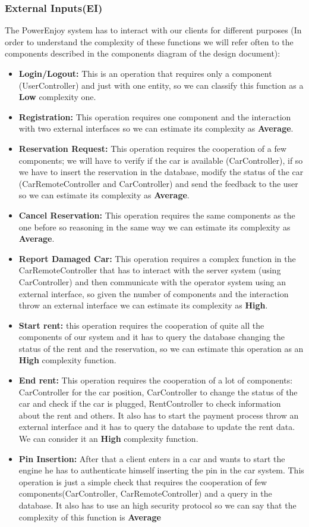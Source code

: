 \subsubsection{External Inputs(EI)}
The PowerEnjoy system has to interact with our clients for different purposes (In order to understand the complexity of these functions we will refer often to the components described in the components diagram of the design document):
\begin{itemize}
\item \textbf{Login/Logout:} This is an operation that requires only a component (UserController) and just with one entity, so we can classify this function as a \textbf{Low} complexity one.
\item \textbf{Registration:} This operation requires one component and the interaction with two external interfaces so we can estimate its complexity as \textbf{Average}.
\item \textbf{Reservation Request:} This operation requires the cooperation of a few components; we will have to verify if the car is available (CarController), if so we have to insert the reservation in the database, modify the status of the car (CarRemoteController and CarController) and send the feedback to the user so we can estimate its complexity as \textbf{Average}.
\item \textbf{Cancel Reservation:} This operation requires the same components as the one before so reasoning in the same way we can estimate its complexity as \textbf{Average}.
\item \textbf{Report Damaged Car:} This operation requires a complex function in the CarRemoteController that has to interact with the server system (using CarController) and then communicate with the operator system using an external interface, so given the number of components and the interaction throw an external interface we can estimate its complexity as \textbf{High}.
\item \textbf{Start rent:} this operation requires the cooperation of quite all the components of our system and it has to query the database changing the status of the rent and the reservation, so we can estimate this operation as an \textbf{High} complexity function.
\item \textbf{End rent:} This operation requires the cooperation of a lot of components: CarController for the car position, CarController to change the status of the car and check if the car is plugged, RentController to check information about the rent and others. It also has to start the payment process throw an external interface and it has to query the database to update the rent data. We can consider it an \textbf{High} complexity function.
\item \textbf{Pin Insertion:} After that a client enters in a car and wants to start the engine he has to authenticate  himself inserting the pin in the car system. This operation is just a simple check that  requires the cooperation of few components(CarController, CarRemoteController) and a query in the database. It also has to use an high security protocol so we can say that the complexity of this function is \textbf{Average}
\end{itemize}

